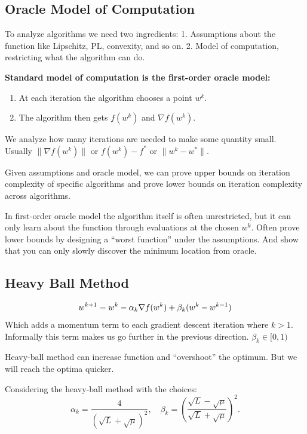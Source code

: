 \documentclass[
]{article}
\providecommand{\tightlist}{%
  \setlength{\itemsep}{0pt}\setlength{\parskip}{0pt}}
\begin{document}
\subsection{Oracle Model of Computation}\label{oracle-model-of-computation}

To analyze algorithms we need two ingredients:
1. Assumptions about the function like Lipschitz, PL, convexity, and so on.
2. Model of computation, restricting what the algorithm can do.

\textbf{Standard model of computation is the first-order oracle model:}

\begin{enumerate}
\def\labelenumi{\arabic{enumi}.}
\tightlist
\item
  At each iteration the algorithm chooses a point \(w^k\).
\item
  The algorithm then gets \(f(w^k)\) and \(\nabla f(w^k)\).
\end{enumerate}

We analyze how many iterations are needed to make some quantity small.
Usually \(\| \nabla f(w^k) \|\) or \(f(w^k) - f^*\) or \(\| w^k - w^* \|\).

Given assumptions and oracle model, we can prove upper bounds on iteration complexity of specific algorithms and prove lower bounds on iteration complexity across algorithms.

In first-order oracle model the algorithm itself is often unrestricted,
but it can only learn about the function through evaluations at the chosen \(w^k\).
Often prove lower bounds by designing a ``worst function'' under the assumptions.
And show that you can only slowly discover the minimum location from oracle.

\subsection{Heavy Ball Method}\label{heavy-ball-method}

\[
w^{k+1} = w^{k} - \alpha_k \nabla f(w^k) + \beta_k (w^k - w^{k-1}) \\
\]
Which adds a momentum term to each gradient descent iteration where \(k > 1\). Informally this term makes us go further in the previous direction. \(\beta_k \in [0, 1)\)

Heavy-ball method can increase function and ``overshoot'' the optimum. But we will reach the optima quicker.

Considering the heavy-ball method with the choices:
\[
\alpha_k = \frac{4}{(\sqrt{L} + \sqrt{\mu})^2}, \quad \beta_k = \left( \frac{\sqrt{L} - \sqrt{\mu}}{\sqrt{L} + \sqrt{\mu}} \right)^2.
\]
\end{document}
